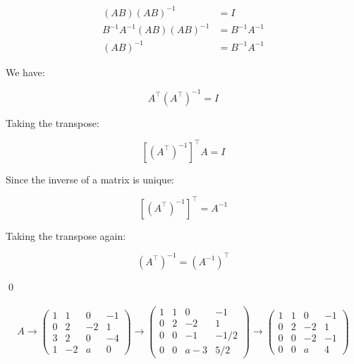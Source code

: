 \documentclass[12pt]{article}
\begin{document}

\begin{equation}
    \begin{split}
        (AB)(AB)^{-1} &= I \\
        B^{-1} A^{-1} (AB)(AB)^{-1} &= B^{-1} A^{-1} \\
        (AB)^{-1} &= B^{-1} A^{-1}
    \end{split}
\end{equation}

We have:

\begin{equation}
    A^{\intercal} (A^{\intercal})^{-1} = I
\end{equation}

Taking the transpose:

\begin{equation}
    \left[ (A^{\intercal})^{-1} \right]^{\intercal} A = I
\end{equation}

Since the inverse of a matrix is unique:

\begin{equation}
    \left[ (A^{\intercal})^{-1} \right]^{\intercal} = A^{-1}
\end{equation}

Taking the transpose again:

\begin{equation}
    (A^{\intercal})^{-1} = (A^{-1})^{\intercal}
\end{equation}


\qed



\begin{equation}
    \begin{split}
        A \to
        \begin{pmatrix}
            1 & 1  & 0  & -1 \\
            0 & 2  & -2 & 1  \\
            3 & 2  & 0  & -4 \\
            1 & -2 & a  & 0
        \end{pmatrix}
        \to
        \begin{pmatrix}
            1 & 1 & 0   & -1   \\
            0 & 2 & -2  & 1    \\
            0 & 0 & -1  & -1/2 \\
            0 & 0 & a-3 & 5/2
        \end{pmatrix}
        \to
        \begin{pmatrix}
            1 & 1 & 0  & -1 \\
            0 & 2 & -2 & 1  \\
            0 & 0 & -2 & -1 \\
            0 & 0 & a  & 4
        \end{pmatrix}
    \end{split}
\end{equation}
\end{document}
